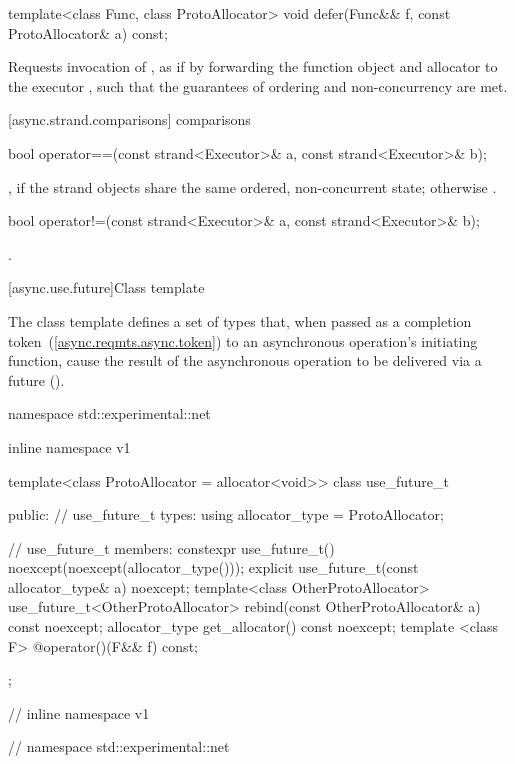 %
\begin{itemdecl}
template<class Func, class ProtoAllocator>
  void defer(Func&& f, const ProtoAllocator& a) const;
\end{itemdecl}

\begin{itemdescr}
\pnum
\effects Requests invocation of , as if by forwarding the function object  and allocator  to the executor , such that the guarantees of ordering and non-concurrency are met.
\end{itemdescr}



[async.strand.comparisons]{ comparisons}

%
\begin{itemdecl}
bool operator==(const strand<Executor>& a, const strand<Executor>& b);
\end{itemdecl}

\begin{itemdescr}
\pnum
\returns {}, if the strand objects share the same ordered, non-concurrent state; otherwise .
\end{itemdescr}

%
\begin{itemdecl}
bool operator!=(const strand<Executor>& a, const strand<Executor>& b);
\end{itemdecl}

\begin{itemdescr}
\pnum
\returns {}.
\end{itemdescr}




[async.use.future]{Class template }

%
\pnum
The class template  defines a set of types that, when passed as a completion token~(\ref{async.reqmts.async.token}) to an asynchronous operation's initiating function, cause the result of the asynchronous operation to be delivered via a future ().

\begin{codeblock}
namespace std::experimental::net {
inline namespace v1 {

  template<class ProtoAllocator = allocator<void>>
  class use_future_t
  {
  public:
    // use_future_t types:
    using allocator_type = ProtoAllocator;

    // use_future_t members:
    constexpr use_future_t() noexcept(noexcept(allocator_type()));
    explicit use_future_t(const allocator_type& a) noexcept;
    template<class OtherProtoAllocator> use_future_t<OtherProtoAllocator>
      rebind(const OtherProtoAllocator& a) const noexcept;
    allocator_type get_allocator() const noexcept;
    template <class F> @\unspec@ operator()(F&& f) const;
  };

} // inline namespace v1
} // namespace std::experimental::net
\end{codeblock}


